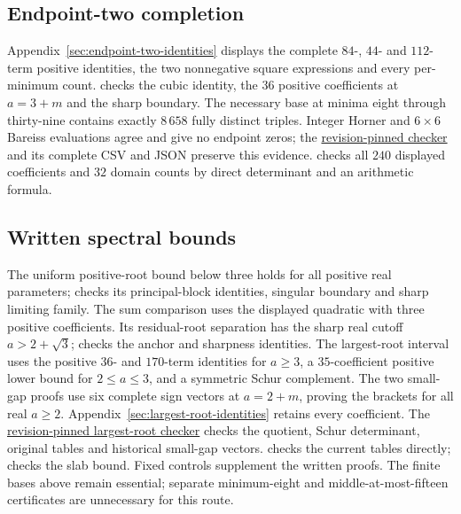 \documentclass[11pt]{article}
\theoremstyle{remark}
\begin{document}
\subsection{Endpoint-two completion}
Appendix~\ref{sec:endpoint-two-identities} displays the complete
$84$-, $44$- and $112$-term positive identities, the two nonnegative
square expressions and every per-minimum count.
 checks the cubic identity,
the $36$ positive coefficients at $a=3+m$ and the sharp boundary.
The necessary base at minima eight through thirty-nine contains exactly
$8\,658$ fully distinct triples. Integer Horner and $6\times6$ Bareiss
evaluations agree and give no endpoint zeros; the
\href{https://github.com/the-omega-institute/ideal-intersection-laplacian/blob/4afe151e1dc7193e6776cc1b08d3606aa804238e/scripts/check_endpoint_two_completion.py}{revision-pinned checker}
and its complete CSV and JSON preserve this evidence.
 checks all $240$
displayed coefficients and $32$ domain counts by direct determinant
and an arithmetic formula.

\subsection{Written spectral bounds}
The uniform positive-root bound below three holds for all positive real
parameters;  checks its
principal-block identities, singular boundary and sharp limiting family.
The sum comparison uses the displayed quadratic with three positive coefficients.
Its residual-root separation has the sharp real cutoff $a>2+\sqrt3$;
 checks the anchor and sharpness identities.
The largest-root interval uses the positive $36$- and $170$-term identities
for $a\geq3$, a $35$-coefficient positive lower bound for $2\leq a\leq3$,
and a symmetric Schur complement. The two small-gap proofs use six
complete sign vectors at $a=2+m$, proving the brackets for all real $a\geq2$.
Appendix~\ref{sec:largest-root-identities} retains every coefficient.
The
\href{https://github.com/the-omega-institute/ideal-intersection-laplacian/blob/4471a5b4a02d97d3dcf78ea004298d5592924a95/scripts/check_largest_root_unit_interval.py}{revision-pinned largest-root checker}
checks the quotient, Schur determinant, original tables and historical
small-gap vectors. 
checks the current tables directly; 
checks the slab bound. Fixed controls supplement the written proofs.
The finite bases above remain essential; separate minimum-eight and
middle-at-most-fifteen certificates are unnecessary for this route.
\end{document}

